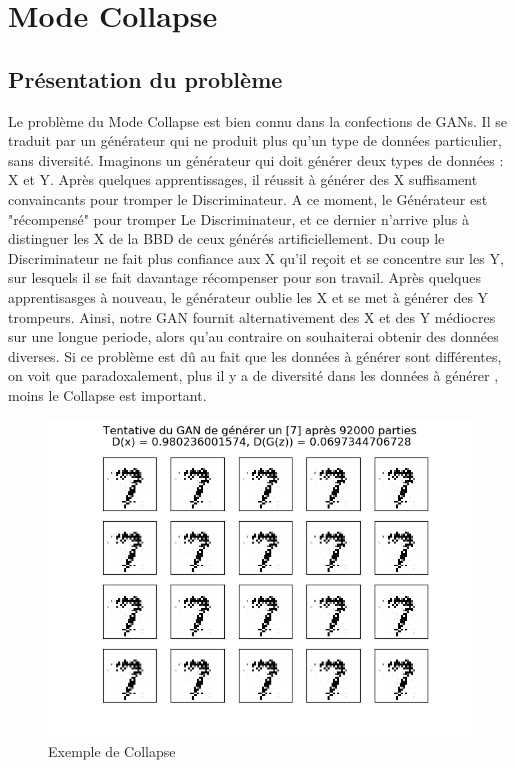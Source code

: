 \section{Mode Collapse}
	\subsection{Présentation du problème}
		Le problème du Mode Collapse est bien connu dans la confections de GANs. Il se traduit par un générateur qui ne produit plus qu'un type de données particulier, sans diversité. 
		Imaginons un générateur qui doit générer deux types de données : X et Y. Après quelques apprentissages, il réussit à générer des X suffisament convaincants pour tromper le Discriminateur. A ce moment, le Générateur est "récompensé" pour tromper Le Discriminateur, et ce dernier n'arrive plus à distinguer les X de la BBD de ceux générés artificiellement. Du coup le Discriminateur ne fait plus confiance aux X qu'il reçoit et se concentre sur les Y, sur lesquels il se fait davantage récompenser pour son travail. Après quelques apprentisasges à nouveau, le générateur oublie les X et se met à générer des Y trompeurs.
		Ainsi, notre GAN fournit alternativement des X et des Y médiocres sur une longue periode, alors qu'au contraire on souhaiterai obtenir des données diverses. Si ce problème est dû au fait que les données à générer sont différentes, on voit que paradoxalement, plus il y a de diversité dans les données à générer ,  moins le Collapse est important.
		
\begin{figure}[h]
  \centerline{\includegraphics[width=0.6\linewidth]{fig/excollapse.png}}
  \caption{Exemple de Collapse}
  \label{fig:ex_collapse}
\end{figure}

